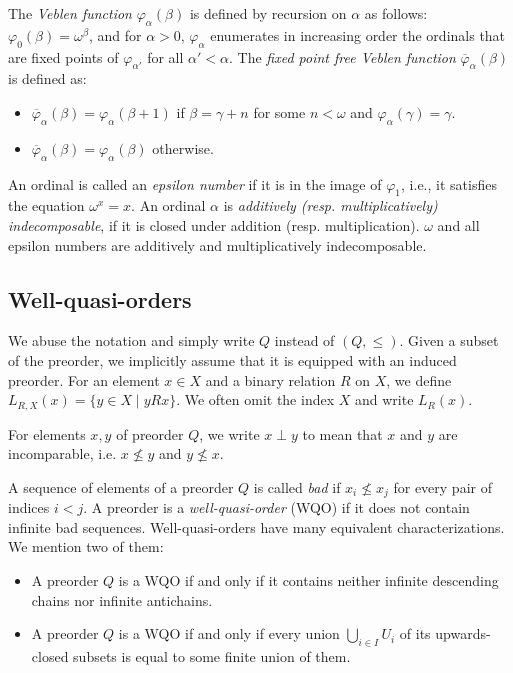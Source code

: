 \documentclass[runningheads]{llncs}
\let \leq \leqslant
\let \phi \varphi
\begin{document}
The \textit{Veblen function} $\phi_\alpha(\beta)$ is defined by recursion on $\alpha$ as follows: $\phi_0(\beta) = \omega^\beta$, and for $\alpha > 0$, $\phi_\alpha$ enumerates in increasing order the ordinals that are fixed points of $\phi_{\alpha'}$ for all $\alpha' < \alpha$. The \textit{fixed point free Veblen function} $\overline{\phi}_\alpha(\beta)$ is defined as:
\begin{itemize}
    \item $\overline{\phi}_\alpha(\beta) = \phi_\alpha(\beta+1)$ if $\beta = \gamma+n$ for some $n < \omega$ and $\phi_\alpha(\gamma) = \gamma$.
    \item $\overline{\phi}_\alpha(\beta) = \phi_\alpha(\beta)$ otherwise.
\end{itemize}

An ordinal is called an \textit{epsilon number} if it is in the image of $\phi_1$, i.e., it satisfies the equation $\omega^x = x$. An ordinal $\alpha$ is \textit{additively (resp. multiplicatively) indecomposable}, if it is closed under addition (resp. multiplication). $\omega$ and all epsilon numbers are additively and multiplicatively indecomposable.

\subsection{Well-quasi-orders}\label{wqos}

We abuse the notation and simply write $Q$ instead of $(Q, \leq)$. Given a subset of the preorder, we implicitly assume that it is equipped with an induced preorder. For an element $x \in X$ and a binary relation $R$ on $X$, we define $L_{R,X}(x) = \{y \in X \mid y R x\}$. We often omit the index $X$ and write $L_R(x)$.

For elements $x, y$ of preorder $Q$, we write $x \perp y$ to mean that $x$ and $y$ are incomparable, i.e. $x \not\leq y$ and $y \not\leq x$.

A sequence of elements of a preorder $Q$ is called \textit{bad} if $x_i \not\leq x_j$ for every pair of indices $i < j$. A preorder is a \textit{well-quasi-order} (WQO) if it does not contain infinite bad sequences. Well-quasi-orders have many equivalent characterizations. We mention two of them:
\begin{itemize}
    \item A preorder $Q$ is a WQO if and only if it contains neither infinite descending chains nor infinite antichains.
    \item A preorder $Q$ is a WQO if and only if every union $\bigcup_{i \in I} U_i$ of its upwards-closed subsets is equal to some finite union of them.
\end{itemize}
\end{document}
